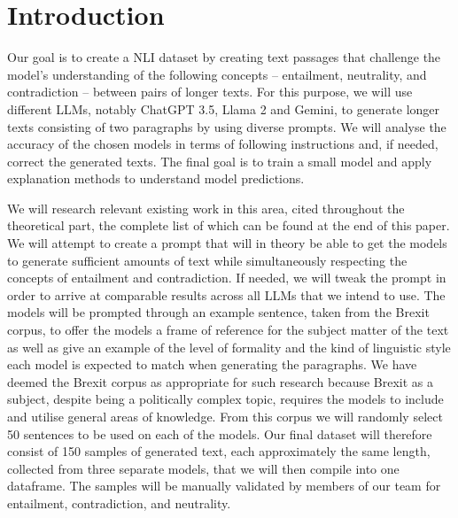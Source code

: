 \documentclass[fleqn,moreauthors,10pt]{ds_report}
\affiliation{\textit{Advisors: Aleš Žagar}}
\begin{document}
\flushbottom 

\maketitle 

\thispagestyle{empty} 


\section*{Introduction}

Our goal is to create a NLI dataset by creating text passages that challenge the model’s understanding of the following concepts – entailment, neutrality, and contradiction – between pairs of longer texts. For this purpose, we will use different LLMs, notably ChatGPT 3.5, Llama 2 and Gemini, to generate longer texts consisting of two paragraphs by using diverse prompts. We will analyse the accuracy of the chosen models in terms of following instructions and, if needed, correct the generated texts. The final goal is to train a small model and apply explanation methods to understand model predictions.

We will research relevant existing work in this area, cited throughout the theoretical part, the complete list of which can be found at the end of this paper. We will attempt to create a prompt that will in theory be able to get the models to generate sufficient amounts of text while simultaneously respecting the concepts of entailment and contradiction. If needed, we will tweak the prompt in order to arrive at comparable results across all LLMs that we intend to use. The models will be prompted through an example sentence, taken from the Brexit corpus, to offer the models a frame of reference for the subject matter of the text as well as give an example of the level of formality and the kind of linguistic style each model is expected to match when generating the paragraphs. We have deemed the Brexit corpus as appropriate  for such research because Brexit as a subject, despite being a politically complex topic, requires the models to include and utilise general areas of knowledge.  From this corpus we will randomly select 50 sentences to be used on each of the models. Our final dataset will therefore consist of 150 samples of generated text, each approximately the same length, collected from three separate models, that we will then compile into one dataframe. The samples will be manually validated by members of our team for entailment, contradiction, and neutrality.
\end{document}

